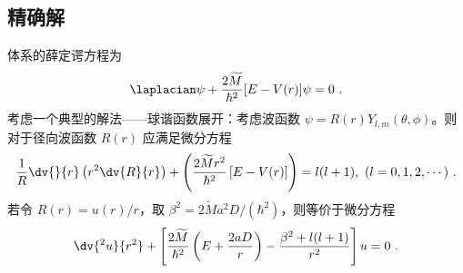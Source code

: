 \subsection{精确解}
体系的薛定谔方程为
\begin{equation}
\laplacian \psi + \frac{2 \widetilde M}{\hbar^2} [E - V(r)] \psi = 0~.
\end{equation}
考虑一个典型的解法——球谐函数展开：考虑波函数 $\psi = R(r) Y_{l, m} (\theta, \phi)$。则对于径向波函数 $R(r)$ 应满足微分方程
\begin{equation}
\frac1R \dv{}{r}\left(r^2 \dv{R}{r}\right) + \left( \frac{2\widetilde M r^2}{\hbar^2} \left[E-V(r)\right] \right) = l(l+1), \ (l = 0, 1, 2, \cdots) ~.
\end{equation}
若令 $R(r) = u(r)/r$，取 $\beta^2=2\widetilde M a^2 D/(\hbar^2)$，则等价于微分方程
\begin{equation}
\dv{^2 u}{r^2} + \left[\frac{2\widetilde M}{\hbar^2} \left(E + \frac{2aD}{r}\right) - \frac{\beta^2 + l(l+1)}{r^2}\right] u = 0 ~.
\end{equation}
